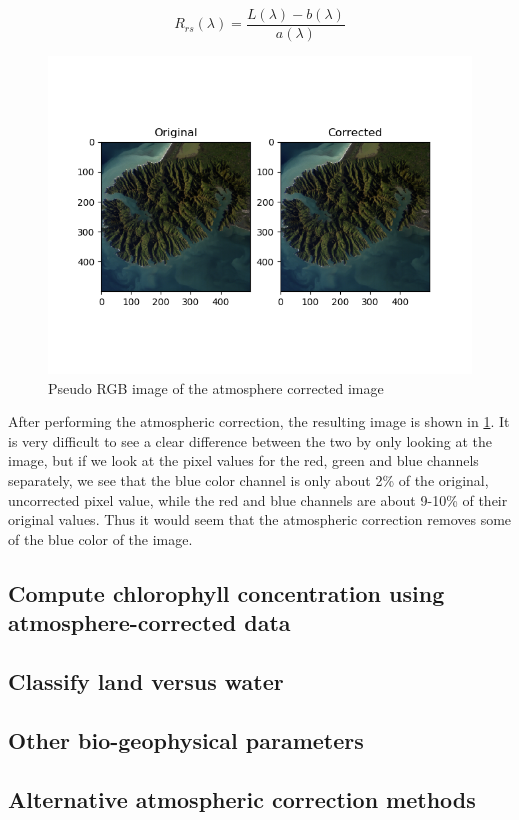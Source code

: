\begin{equation}
    \label{eq:R_rs}
    R_{rs}(\lambda) = \frac{L(\lambda) - b(\lambda)}{a(\lambda)}
\end{equation}

\begin{figure}
    \centering
    \includegraphics[width=\textwidth]{../fig/pseudo_rgb_corrected.png}
    \caption{Pseudo RGB image of the atmosphere corrected image}
    \label{fig:RGB_corrected}
\end{figure}

After performing the atmospheric correction, the resulting image is shown in 
\cref{fig:RGB_corrected}. It is very difficult to see a clear difference between 
the two by only looking at the image, but if we look at the pixel values for the red, 
green and blue channels separately, we see that the blue color channel is only about 2\% 
of the original, uncorrected pixel value, while the red and blue channels are about 9-10\% 
of their original values. Thus it would seem that the atmospheric correction removes some of 
the blue color of the image. 

\subsection{Compute chlorophyll concentration using atmosphere-corrected data}

\subsection{Classify land versus water}

\subsection{Other bio-geophysical parameters}

\subsection{Alternative atmospheric correction methods}